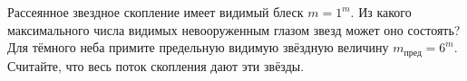 Рассеянное звездное скопление имеет видимый блеск $m = 1^m$. Из
какого максимального числа видимых невооруженным глазом звезд может оно
состоять? Для тёмного неба примите предельную видимую звёздную величину $m_{\text{пред}}=6^m$. Считайте, что весь поток скопления дают эти звёзды.
